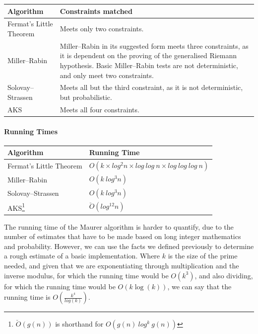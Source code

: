     \begin{center}
        \begin{tabular}{ | l | p{7cm} |}
          \hline
          \textbf{Algorithm} & \textbf{Constraints matched}  \\ \hline
          Fermat's Little Theorem & Meets only two constraints. \\ \hline
          Miller--Rabin & Miller--Rabin in its suggested form meets three constraints, as it is dependent on the proving of the generalised Riemann hypothesis. Basic Miller--Rabin tests are not deterministic, and only meet two constraints. \\ \hline
          Solovay--Strassen &  Meets all but the third constraint, as it is not deterministic, but probabilistic.\\ \hline
          AKS & Meets all four constraints. \\ \hline
        \end{tabular}
      \end{center}
    
     \paragraph{Running Times}
      
      \begin{center}
        \begin{tabular}{ | l | l |}
          \hline
          \textbf{Algorithm} & \textbf{Running Time}  \\ \hline
          Fermat's Little Theorem & $O(k \times log^2n \times log \ log \ n \times log \ log \ log \ n)$ \\ \hline
          Miller--Rabin & $O(k \ log^3n)$ \\ \hline
          Solovay--Strassen & $O(k \ log^3n)$ \\ \hline
          AKS\footnote{$\breve{O}(g(n))$ is shorthand for $O(g(n) \ log^k \ g(n))$} & $\breve{O}(log^{12}n)$ \\ \hline
        \end{tabular}
      \end{center}
      
      The running time of the Maurer algorithm is harder to quantify, due to the number of estimates that have to be made based on long integer mathematics and probability. However, we can use the facts we defined previously to determine a rough estimate of a basic implementation. Where $k$ is the size of the prime needed, and given that we are exponentiating through multiplication and the inverse modulus, for which the running time would be $O(k^3)$, and also dividing, for which the running time would be $O(k\log(k))$, we can say that the running time is $O(\frac{k^4}{log(k)})$\cite{Schwarz:2007aa}.
      
